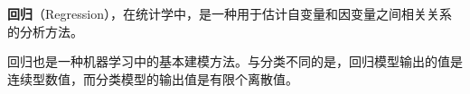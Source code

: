 
\textbf{回归}（Regression），在统计学中，是一种用于估计自变量和因变量之间相关关系的分析方法。

回归也是一种机器学习中的基本建模方法。与分类不同的是，回归模型输出的值是连续型数值，而分类模型的输出值是有限个离散值。